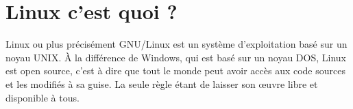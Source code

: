 \chapter{Linux c'est quoi ?}

Linux ou plus précisément GNU/Linux est un système d'exploitation basé sur un noyau UNIX. À la différence de Windows, qui est basé sur un noyau DOS, Linux est open source, c'est à dire que tout le monde peut avoir accès aux code sources et les modifiés à sa guise. La seule règle étant de laisser son œuvre libre et disponible à tous.
